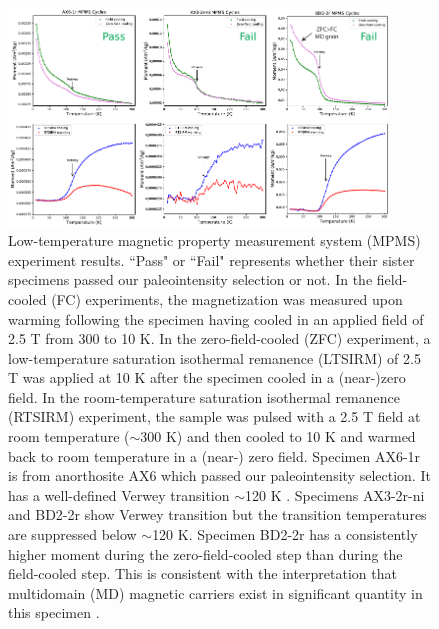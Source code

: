\clearpage

\begin{figure}
\noindent\includegraphics[width=0.9\textwidth]{figure/Zhang2022/MPMS.pdf}
\centering
\caption[Beaver River diabase and anorthosite low-temperature magnetic property measurement results]{Low-temperature magnetic property measurement system (MPMS) experiment results. ``Pass" or ``Fail" represents whether their sister specimens passed our paleointensity selection or not. In the field-cooled (FC) experiments, the magnetization was measured upon warming following the specimen having cooled in an applied field of 2.5 T from 300 to 10 K. In the zero-field-cooled (ZFC) experiment, a low-temperature saturation isothermal remanence (LTSIRM) of 2.5 T was applied at 10 K after the specimen cooled in a (near-)zero field. In the room-temperature saturation isothermal remanence (RTSIRM) experiment, the sample was pulsed with a 2.5 T field at room temperature ($\sim$300 K) and then cooled to 10 K and warmed back to room temperature in a (near-) zero field. Specimen AX6-1r is from anorthosite AX6 which passed our paleointensity selection. It has a well-defined Verwey transition $\sim$120 K \cite{Verwey1939a}. Specimens AX3-2r-ni and BD2-2r show Verwey transition but the transition temperatures are suppressed below $\sim$120 K. Specimen BD2-2r has a consistently higher moment during the zero-field-cooled step than during the field-cooled step. This is consistent with the interpretation that multidomain (MD) magnetic carriers exist in significant quantity in this specimen \cite{Carter-Stiglitz2006a}.}
\label{fig:MPMS}
\end{figure}

\clearpage

